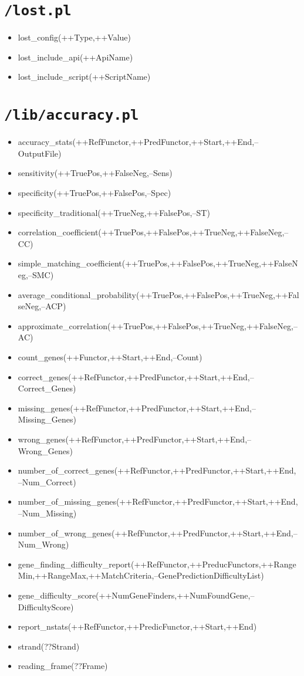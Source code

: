 \section{\texttt{/lost.pl}}
%
\begin{itemize}
\item lost\_config(++Type,++Value)
\item lost\_include\_api(++ApiName)
\item lost\_include\_script(++ScriptName)
\end{itemize}


\section{\texttt{/lib/accuracy.pl}}
%
\begin{itemize}
\item accuracy\_stats(++RefFunctor,++PredFunctor,++Start,++End,--OutputFile)
\item sensitivity(++TruePos,++FalseNeg,--Sens)
\item specificity(++TruePos,++FalsePos,--Spec)
\item specificity\_traditional(++TrueNeg,++FalsePos,--ST)
\item correlation\_coefficient(++TruePos,++FalsePos,++TrueNeg,++FalseNeg,--CC)
\item simple\_matching\_coefficient(++TruePos,++FalsePos,++TrueNeg,++FalseNeg,--SMC)
\item average\_conditional\_probability(++TruePos,++FalsePos,++TrueNeg,++FalseNeg,--ACP)
\item approximate\_correlation(++TruePos,++FalsePos,++TrueNeg,++FalseNeg,--AC)
\item count\_genes(++Functor,++Start,++End,--Count)
\item correct\_genes(++RefFunctor,++PredFunctor,++Start,++End,--Correct\_Genes)
\item missing\_genes(++RefFunctor,++PredFunctor,++Start,++End,--Missing\_Genes)
\item wrong\_genes(++RefFunctor,++PredFunctor,++Start,++End,--Wrong\_Genes)
\item number\_of\_correct\_genes(++RefFunctor,++PredFunctor,++Start,++End,--Num\_Correct)
\item number\_of\_missing\_genes(++RefFunctor,++PredFunctor,++Start,++End,--Num\_Missing)
\item number\_of\_wrong\_genes(++RefFunctor,++PredFunctor,++Start,++End,--Num\_Wrong)
\item gene\_finding\_difficulty\_report(++RefFunctor,++PreducFunctors,++RangeMin,++RangeMax,++MatchCriteria,--GenePredictionDifficultyList)
\item gene\_difficulty\_score(++NumGeneFinders,++NumFoundGene,--DifficultyScore)
\item report\_nstats(++RefFunctor,++PredicFunctor,++Start,++End)
\item strand(??Strand)
\item reading\_frame(??Frame)
\end{itemize}

